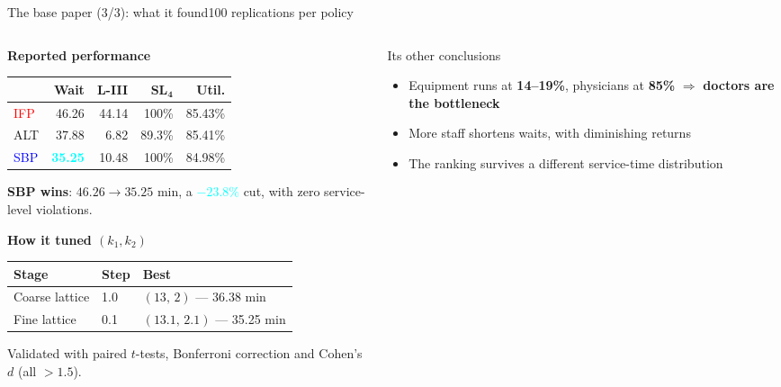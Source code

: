 \documentclass[aspectratio=169,11pt]{beamer}
\newcommand{\hl}[1]{\textcolor{deep}{\textbf{#1}}}
\newcommand{\good}[1]{\textcolor{aqua}{\textbf{#1}}}
\begin{document}
\begin{frame}{The base paper \textnormal{(3/3)}: what it found}{100 replications per policy}
\vspace{-0.3em}
\begin{columns}[T,onlytextwidth]
\begin{column}{0.53\textwidth}
{\footnotesize\textbf{Reported performance}}
\vspace{0.25em}

{\footnotesize
\begin{tabular}{@{}lrrrr@{}}
\toprule
 & \textbf{Wait} & \textbf{L-III} & $\mathbf{SL_4}$ & \textbf{Util.} \\
\midrule
\textcolor{red}{IFP}   & 46.26 & 44.14 & 100\%  & 85.43\% \\
\textcolor{amber}{ALT} & 37.88 &  6.82 & 89.3\% & 85.41\% \\
\textcolor{blue}{SBP}  & \good{35.25} & 10.48 & 100\%  & 84.98\% \\
\bottomrule
\end{tabular}}
\vspace{0.45em}

{\footnotesize \hl{SBP wins}: $46.26 \rightarrow 35.25$ min, a
\good{$-23.8\%$} cut, with zero service-level violations.}
\vspace{0.5em}

{\footnotesize\textbf{How it tuned $(k_1,k_2)$}}
\vspace{0.2em}

{\scriptsize
\begin{tabular}{@{}lll@{}}
\toprule
\textbf{Stage} & \textbf{Step} & \textbf{Best} \\
\midrule
Coarse lattice & 1.0 & $(13,\,2)$ --- 36.38 min \\
Fine lattice   & 0.1 & $(13.1,\,2.1)$ --- 35.25 min \\
\bottomrule
\end{tabular}}
\vspace{0.45em}

{\scriptsize\color{soft} Validated with paired $t$-tests, Bonferroni
correction and Cohen's $d$ (all $>1.5$).}
\end{column}
\begin{column}{0.45\textwidth}
\vspace{-0.3em}
\begin{block}{Its other conclusions}
\scriptsize
\begin{itemize}\setlength\itemsep{0.12em}\setlength\parskip{0pt}
  \item Equipment runs at \hl{14--19\%}, physicians at \hl{85\%}
        $\Rightarrow$ \textbf{doctors are the bottleneck}
  \item More staff shortens waits, with diminishing returns
  \item The ranking survives a different service-time distribution
\end{itemize}
\end{block}


\end{column}
\end{columns}
\end{frame}
\end{document}
